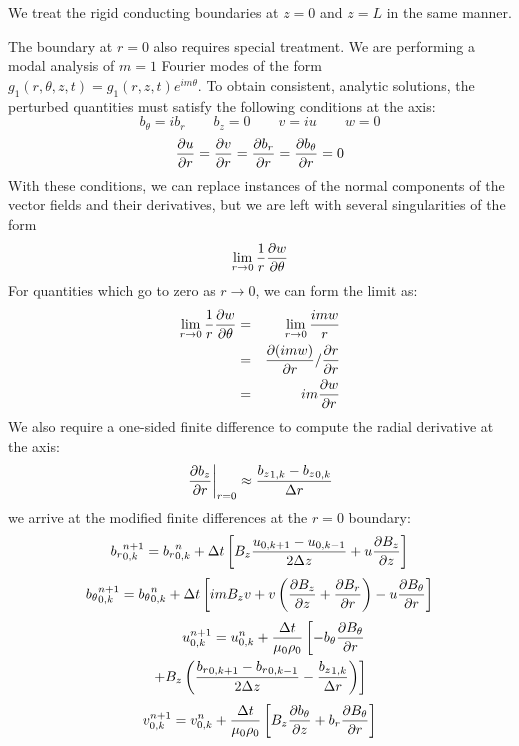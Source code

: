 \documentclass[%
 reprint,
 amsmath,amssymb,
 aps,
]{revtex4-2}
\begin{document}
We treat the rigid conducting boundaries at $z=0$ and $z=L$ in the same manner.

The boundary at $r=0$ also requires special treatment. We are performing a modal analysis of $m=1$ Fourier modes of the form $g_1(r, \theta, z, t) = g_1(r, z, t) e^{i m \theta}$. To obtain consistent, analytic solutions, the perturbed quantities must satisfy the following conditions at the axis:
\begin{equation}
b_\theta = i b_r \qquad b_z = 0 \qquad v = i u \qquad w = 0
\end{equation}
\begin{equation}
\pdv{u}{r} = \pdv{v}{r} = \pdv{b_r}{r} = \pdv{b_\theta}{r} = 0
\end{equation}
With these conditions, we can replace instances of the normal components of the vector fields and their derivatives, but we are left with several singularities of the form
\begin{equation}
\lim_{r \rightarrow 0} \frac{1}{r} \pdv{w}{\theta}
\end{equation}
For quantities which go to zero as $r \rightarrow 0$, we can form the limit as:
\begin{eqnarray}
\lim_{r \rightarrow 0} \frac{1}{r} \pdv{w}{\theta} & = & \lim_{r \rightarrow 0} \frac{i m w}{r} \\
& = & \pdv{(i m w)}{r} / \pdv{r}{r} \\
& = & i m \pdv{w}{r}
\end{eqnarray}
We also require a one-sided finite difference to compute the radial derivative at the axis:
\begin{equation}
\left. \pdv{b_z}{r} \right|_{r=0} \approx \frac{{b_z}_{1, k}-{b_z}_{0,k}}{\Delta r}
\end{equation}
we arrive at the modified finite differences at the $r=0$ boundary:
\begin{eqnarray*}
{b_r}_{0, k} ^{n+1} = {b_r}_{0, k} ^n + \Delta t \left[ B_z \frac{u_{0, k+1}-u_{0, k-1}}{2 \Delta z} + u \pdv{B_z}{z} \right]
\end{eqnarray*}
\begin{eqnarray*}
{b_\theta}_{0, k} ^{n+1} = {b_\theta}_{0, k} ^{n} + \Delta t \left[ i m B_z v + v \left( \pdv{B_z}{z} + \pdv{B_r}{r} \right) - u \pdv{B_\theta}{r} \right]
\end{eqnarray*}
\begin{eqnarray*}
u_{0, k} ^{n+1} = u_{0, k} ^n + \frac{\Delta t}{\mu_0 \rho_0} \left[ - b_\theta \pdv{B_\theta}{r} \right. \\ 
\left. + B_z \left( \frac{{b_r}_{0, k+1}-{b_r}_{0, k-1}}{2 \Delta z} - \frac{{b_z}_{1, k}}{\Delta r} \right) \right]
\end{eqnarray*}
\begin{eqnarray*}
v_{0, k} ^{n+1} = v_{0, k} ^n + \frac{\Delta t}{\mu_0 \rho_0} \left[ B_z \pdv{b_\theta}{z} + b_r \pdv{B_\theta}{r} \right]
\end{eqnarray*}
\end{document}
